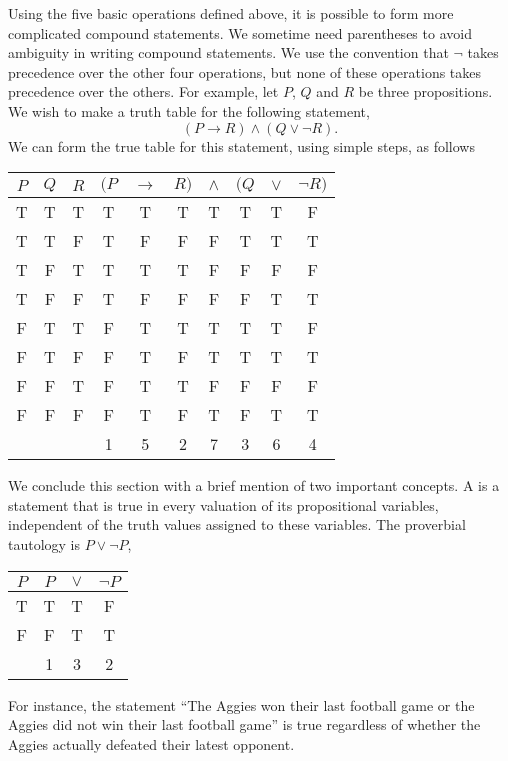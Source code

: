 Using the five basic operations defined above, it is possible to form more complicated compound statements.
We sometime need parentheses to avoid ambiguity in writing compound statements.
We use the convention that $\neg$ takes precedence over the other four operations, but none of these operations takes precedence over the others.
For example, let $P$, $Q$ and $R$ be three propositions.
We wish to make a truth table for the following statement,
\begin{equation} \label{equation:LogicStatement}
(P \rightarrow R) \wedge (Q \vee \neg R) .
\end{equation}
We can form the true table for this statement, using simple steps, as follows
\begin{center}
\begin{tabular}{|c|c|c|ccccccc|}
\hline
$P$ & $Q$ & $R$
& $(P$ & $\rightarrow$ & $R)$ & $\wedge$ & $(Q$ & $\vee$ & $\neg R)$ \\
\hline
T & T & T & T & T & T & T & T & T & F \\
T & T & F & T & F & F & F & T & T & T \\
T & F & T & T & T & T & F & F & F & F \\
T & F & F & T & F & F & F & F & T & T \\
F & T & T & F & T & T & T & T & T & F \\
F & T & F & F & T & F & T & T & T & T \\
F & F & T & F & T & T & F & F & F & F \\
F & F & F & F & T & F & T & F & T & T \\
& & & 1 & 5 & 2 & 7 & 3 & 6 & 4 \\
\hline
\end{tabular}
\end{center}

We conclude this section with a brief mention of two important concepts.
A  is a statement that is true in every valuation of its propositional variables, independent of the truth values assigned to these variables.
The proverbial tautology is $P \vee \neg P$,
\begin{center}
\begin{tabular}{|c|ccc|}
\hline
$P$ & $P$ & $\vee$ & $\neg P$ \\
\hline
T & T & T & F \\
F & F & T & T \\
& 1 & 3 & 2 \\
\hline
\end{tabular}
\end{center}
For instance, the statement ``The Aggies won their last football game or the Aggies did not win their last football game'' is true regardless of whether the Aggies actually defeated their latest opponent.

